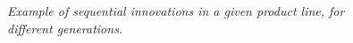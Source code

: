 \documentclass[letterpaper,12pt]{article}
\theoremstyle{definition}
\begin{document}
\begin{figure}[!htbp]\centering \captionsetup{width=5.8in}
    \caption{\label{fig:QLadder}\textit{Example of sequential innovations in a given product line, for different generations.}}
\end{figure}
\end{document}
